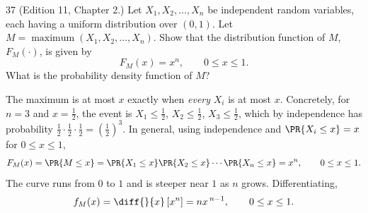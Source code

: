 \documentclass[11pt]{article}
\begin{document}
\begin{problem}{37}
  (Edition 11, Chapter 2.) Let $X_1, X_2, \dots, X_n$ be independent random
  variables, each having a uniform distribution over $(0,1)$. Let
  $M = \operatorname{maximum}(X_1, X_2, \dots, X_n)$. Show that the
  distribution function of $M$, $F_M(\cdot)$, is given by
  \[
    F_M(x) = x^n, \qquad 0 \le x \le 1.
  \]
  What is the probability density function of $M$?
\end{problem}
The maximum is at most $x$ exactly when \emph{every} $X_{i}$ is at most $x$. Concretely,
for $n = 3$ and $x = \tfrac{1}{2}$, the event is $X_{1}\le\tfrac{1}{2}$,
$X_{2}\le\tfrac{1}{2}$, $X_{3}\le\tfrac{1}{2}$, which by independence has probability
$\tfrac{1}{2}\cdot\tfrac{1}{2}\cdot\tfrac{1}{2} = \left(\tfrac{1}{2}\right)^{3}$.
In general, using independence and $\PR{X_{i}\le x} = x$ for $0 \le x \le 1$,
\[
  F_{M}(x) = \PR{M \le x}
           = \PR{X_{1}\le x}\PR{X_{2}\le x}\cdots\PR{X_{n}\le x}
           = x^{n}, \qquad 0 \le x \le 1 .
\]
The curve runs from $0$ to $1$ and is steeper near $1$ as $n$ grows. Differentiating,
\[
  f_{M}(x) = \diff{}{x}\left[x^{n}\right] = n x^{\,n-1}, \qquad 0 \le x \le 1 .
\]

%
\end{document}
